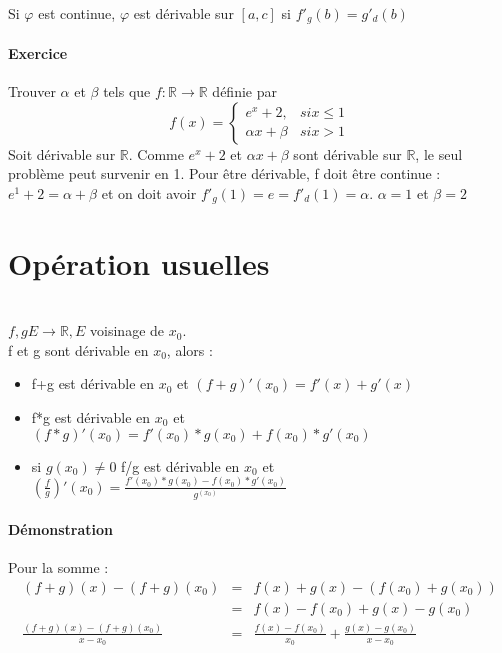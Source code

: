 		Si $\varphi$ est continue, $\varphi$ est dérivable sur $[a, c]$ si $f'_g(b) = g'_d(b)$

		\paragraph{Exercice} Trouver $\alpha$ et $\beta$ tels que $f:\mathbb{R} \rightarrow \mathbb{R}$ définie par 
		\[f(x) = 
			\left\{
				\begin{array}{rl}
					e^x +2, & si x \leq 1 \\
					\alpha x + \beta & si x > 1
				\end{array}
				\right.
			\]
			Soit dérivable sur $\mathbb{R}$. Comme $e^x +2$ et $\alpha x + \beta$ sont dérivable sur $\mathbb{R}$, le seul problème peut survenir en 1.
			Pour être dérivable, f doit être continue :
			$e^1 + 2 = \alpha + \beta$ et on doit avoir $f'_g(1) = e = f'_d(1) = \alpha$. $\alpha = 1$ et $\beta = 2$

			\section{Opération usuelles} ~\\
			$f, g E \rightarrow \mathbb{R}, E$ voisinage de $x_0$.
			~\\
			f et g sont dérivable en $x_0$, alors :
			\begin{itemize}
				\item f+g est dérivable en $x_0$ et $(f+g)'(x_0) = f'(x)+g'(x)$
				\item f*g est dérivable en $x_0$ et $(f*g)'(x_0) = f'(x_0)*g(x_0)+f(x_0)*g'(x_0)$
				\item si $g(x_0) \neq 0$ f/g est dérivable en $x_0$ et $(\frac{f}{g})'(x_0) = \frac{f'(x_0)*g(x_0)-f(x_0)*g'(x_0)}{g^(x_0)}$
			\end{itemize}

			\paragraph{Démonstration} 
			Pour la somme : 
			\[\begin{array}{rcl}
				(f+g)(x) - (f+g)(x_0) &=& f(x)+g(x) - (f(x_0)+g(x_0)) \\
																							   &=& f(x) - f(x_0) + g(x) - g(x_0) \\
				\frac{(f+g)(x)-(f+g)(x_0)}{x-x_0} &=& \frac{f(x) - f(x_0)}{x_0} + \frac{g(x) - g(x_0)}{x-x_0}
		\end{array}\]

